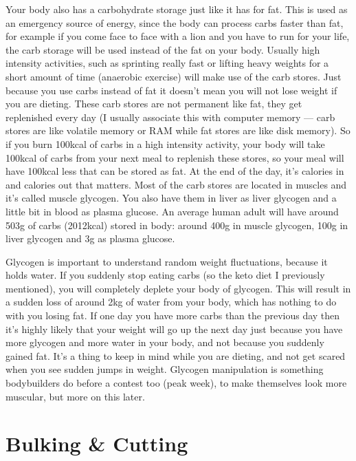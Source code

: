 \documentclass[openany, 12pt]{book}
\begin{document}
	Your body also has a carbohydrate storage just like it has for fat. This is used as an emergency source of energy, since the body can process carbs faster than fat, 
	for example if you come face to face with a lion and you have to run for your life, the carb storage will be used instead of the fat on your body. 
	Usually high intensity activities, such as sprinting really fast or lifting heavy weights for a short amount of time (anaerobic exercise) will make use of the carb stores.
	Just because you use carbs instead of fat it doesn't mean you will not lose weight if you are dieting. These carb stores are not permanent like fat, they get replenished
	every day (I usually associate this with computer memory --- carb stores are like volatile memory or RAM while fat stores are like disk memory). So if you burn 100kcal of
	carbs in a high intensity activity, your body will take 100kcal of carbs from your next meal to replenish these stores, so your meal will have 100kcal less that can be
	stored as fat. At the end of the day, it's calories in and calories out that matters. Most of the carb stores are located in muscles and it's called  muscle glycogen. 
	You also have them in liver as liver glycogen and a little bit in blood as plasma glucose. An average human adult will have around 503g of carbs (2012kcal) stored in body:
	around 400g in muscle glycogen, 100g in liver glycogen and 3g as plasma glucose. 
	
	Glycogen is important to understand random weight fluctuations, because it holds water. If you suddenly stop eating carbs (so the keto diet I previously mentioned), you will
	completely deplete your body of glycogen. This will result in a sudden loss of around 2kg of water from your body, which has nothing to do with you losing fat. If one day you
	have more carbs than the previous day then it's highly likely that your weight will go up the next day just because you have more glycogen and more water in your body, and not
	because you suddenly gained fat. It's a thing to keep in mind while you are dieting, and not get scared when you see sudden jumps in weight. Glycogen manipulation is something
	bodybuilders do before a contest too (peak week), to make themselves look more muscular, but more on this later.
		
	\section{Bulking \& Cutting}	
	
\end{document}
